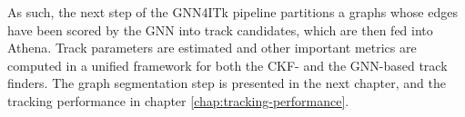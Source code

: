 As such, the next step of the GNN4ITk pipeline partitions a graphs whose edges have been scored by the GNN into track candidates, which are then fed into Athena. 
Track parameters are estimated and other important metrics are computed in a unified framework for both the CKF- and the GNN-based track finders.
The graph segmentation step is presented in the next chapter, and the tracking performance in chapter \ref{chap:tracking-performance}.

